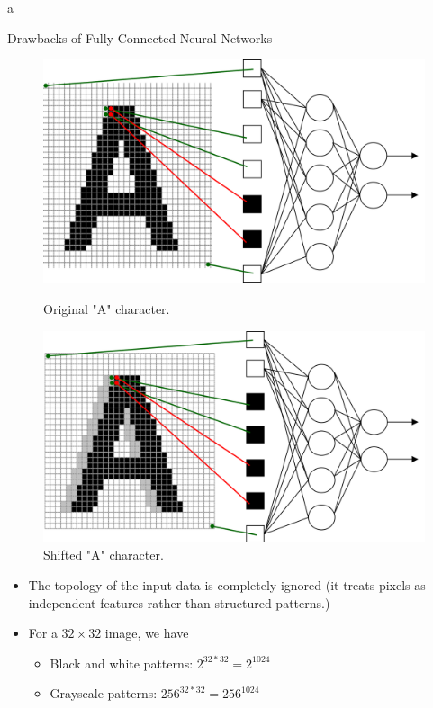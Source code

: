 a\documentclass[10pt]{beamer}
\theoremstyle{remark}
\theoremstyle{definition}
\begin{document}
\begin{frame}[allowframebreaks]{Drawbacks of Fully-Connected Neural Networks}
\begin{figure}[ht]
\centering
\begin{minipage}[t]{0.45\textwidth}
    \centering
    \includegraphics[width=\textwidth,height=0.7\textheight,keepaspectratio]{./images/nn_3.png}
    \caption{Original "A" character.}
    \label{fig:original_a}
\end{minipage}
\hfill
\begin{minipage}[t]{0.45\textwidth}
    \centering
    \includegraphics[width=\textwidth,height=0.7\textheight,keepaspectratio]{./images/nn_4.png}
    \caption{Shifted "A" character.}
    \label{fig:shifted_a}
\end{minipage}
\end{figure}


\framebreak

\begin{itemize}
    \item The topology of the input data is completely ignored (it treats pixels as independent features rather than structured patterns.)
    \item For a $32 \times 32$ image, we have
    \begin{itemize}
        \item Black and white patterns: $2^{32*32} = 2^{1024}$
        \item Grayscale patterns: $256^{32*32} = 256^{1024}$
    \end{itemize}
\end{itemize}


\end{frame}
\end{document}
